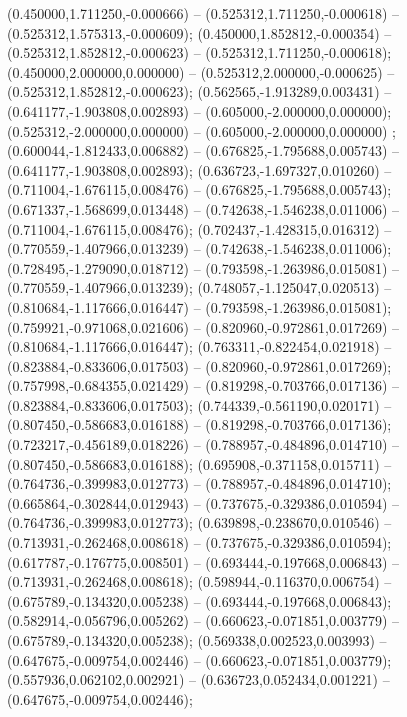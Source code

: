  (0.450000,1.711250,-0.000666) -- (0.525312,1.711250,-0.000618) -- (0.525312,1.575313,-0.000609);
 (0.450000,1.852812,-0.000354) -- (0.525312,1.852812,-0.000623) -- (0.525312,1.711250,-0.000618);
 (0.450000,2.000000,0.000000) -- (0.525312,2.000000,-0.000625) -- (0.525312,1.852812,-0.000623);
 (0.562565,-1.913289,0.003431) -- (0.641177,-1.903808,0.002893) -- (0.605000,-2.000000,0.000000);
 (0.525312,-2.000000,0.000000) -- (0.605000,-2.000000,0.000000) ;
 (0.600044,-1.812433,0.006882) -- (0.676825,-1.795688,0.005743) -- (0.641177,-1.903808,0.002893);
 (0.636723,-1.697327,0.010260) -- (0.711004,-1.676115,0.008476) -- (0.676825,-1.795688,0.005743);
 (0.671337,-1.568699,0.013448) -- (0.742638,-1.546238,0.011006) -- (0.711004,-1.676115,0.008476);
 (0.702437,-1.428315,0.016312) -- (0.770559,-1.407966,0.013239) -- (0.742638,-1.546238,0.011006);
 (0.728495,-1.279090,0.018712) -- (0.793598,-1.263986,0.015081) -- (0.770559,-1.407966,0.013239);
 (0.748057,-1.125047,0.020513) -- (0.810684,-1.117666,0.016447) -- (0.793598,-1.263986,0.015081);
 (0.759921,-0.971068,0.021606) -- (0.820960,-0.972861,0.017269) -- (0.810684,-1.117666,0.016447);
 (0.763311,-0.822454,0.021918) -- (0.823884,-0.833606,0.017503) -- (0.820960,-0.972861,0.017269);
 (0.757998,-0.684355,0.021429) -- (0.819298,-0.703766,0.017136) -- (0.823884,-0.833606,0.017503);
 (0.744339,-0.561190,0.020171) -- (0.807450,-0.586683,0.016188) -- (0.819298,-0.703766,0.017136);
 (0.723217,-0.456189,0.018226) -- (0.788957,-0.484896,0.014710) -- (0.807450,-0.586683,0.016188);
 (0.695908,-0.371158,0.015711) -- (0.764736,-0.399983,0.012773) -- (0.788957,-0.484896,0.014710);
 (0.665864,-0.302844,0.012943) -- (0.737675,-0.329386,0.010594) -- (0.764736,-0.399983,0.012773);
 (0.639898,-0.238670,0.010546) -- (0.713931,-0.262468,0.008618) -- (0.737675,-0.329386,0.010594);
 (0.617787,-0.176775,0.008501) -- (0.693444,-0.197668,0.006843) -- (0.713931,-0.262468,0.008618);
 (0.598944,-0.116370,0.006754) -- (0.675789,-0.134320,0.005238) -- (0.693444,-0.197668,0.006843);
 (0.582914,-0.056796,0.005262) -- (0.660623,-0.071851,0.003779) -- (0.675789,-0.134320,0.005238);
 (0.569338,0.002523,0.003993) -- (0.647675,-0.009754,0.002446) -- (0.660623,-0.071851,0.003779);
 (0.557936,0.062102,0.002921) -- (0.636723,0.052434,0.001221) -- (0.647675,-0.009754,0.002446);
